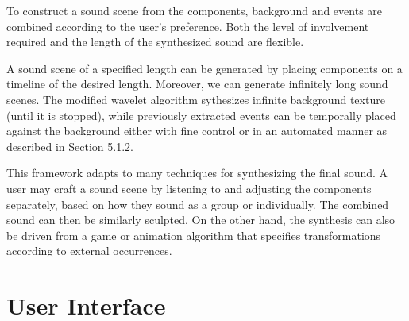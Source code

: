\documentclass{acmsiggraph}               %
\begin{document}

To construct a sound scene from the components, background and events are combined 
according to the user's preference. Both the level of involvement required and the 
length of the synthesized sound are flexible. 

A sound scene of a specified length can be generated by placing components 
on a timeline of the desired length. Moreover, we can generate infinitely long sound 
scenes. The modified wavelet algorithm sythesizes infinite background texture (until it 
is stopped), while previously extracted events can be temporally placed against the 
background either with fine control or in an automated manner as described in Section 5.1.2. 

This framework adapts to many techniques for synthesizing the final sound. A user may 
craft a sound scene by listening to and adjusting the components separately, based on how they 
sound as a group or individually. The combined sound can then be similarly sculpted. On the other 
hand, the synthesis can also be driven from a game or animation algorithm that specifies 
transformations according to external occurrences.


\section{User Interface}
\end{document}
